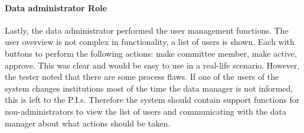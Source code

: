 \paragraph{Data administrator Role}
Lastly, the data administrator performed the user management functions.
The user overview is not complex in functionality, a list of users is shown.
Each with buttons to perform the following actions: make committee member, make active, approve.
This was clear and would be easy to use in a real-life scenario.
However, the tester noted that there are some process flaws.
If one of the users of the system changes institutions most of the time the data manager is not informed, this is left to the P.I.s.
Therefore the system should contain support functions for non-administrators to view the list of users and communicating with the data manager about what actions should be taken.